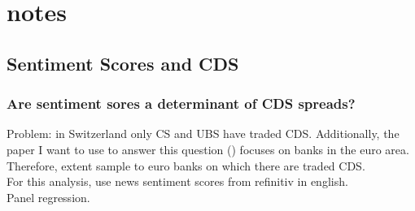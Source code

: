 \chapter{notes}\label{sec7}
\thispagestyle{empty}

%
%
%
%

\section{Sentiment Scores and CDS}

\subsection{Are sentiment sores a determinant of CDS spreads?}

Problem: in Switzerland only CS and UBS have traded CDS. Additionally, the paper I want to use to answer this question (\cite{annaert2013}) focuses on banks in the euro area. Therefore, extent sample to euro banks on which there are traded CDS.\\
For this analysis, use news sentiment scores from refinitiv in english. \\

Panel regression. \\

